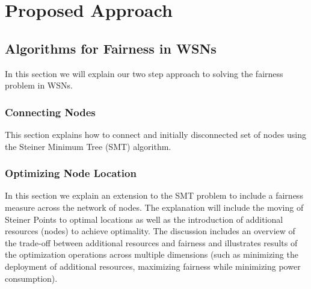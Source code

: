 \section{Proposed Approach}

\subsection{Algorithms for Fairness in WSNs}
In this section we will explain our two step approach to solving the fairness problem in WSNs.
\subsubsection{Connecting Nodes}
This section explains how to connect and initially disconnected set of nodes using the Steiner Minimum Tree (SMT) algorithm.
\subsubsection{Optimizing Node Location}
In this section we explain an extension to the SMT problem to include a fairness measure across the network of nodes.
The explanation will include the moving of Steiner Points to optimal locations as well as the introduction of additional resources (nodes) to achieve optimality. The discussion includes an overview of the trade-off between additional resources and  fairness and illustrates results of the optimization operations across multiple dimensions (such as minimizing the deployment of additional resources, maximizing fairness while minimizing power consumption).